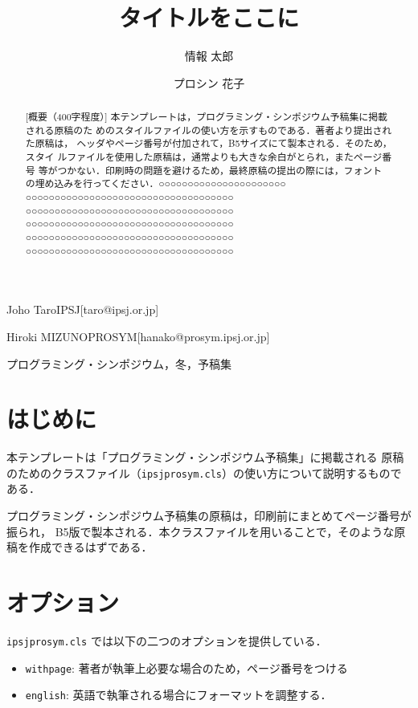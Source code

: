 \documentclass{ipsjprosym}
\begin{document}
\title{タイトルをここに}


\author{情報 太郎}{Joho Taro}{IPSJ}[taro@ipsj.or.jp]
\author{プロシン 花子}{Hiroki MIZUNO}{PROSYM}[hanako@prosym.ipsj.or.jp]

\begin{abstract}
[概要（400字程度）]
本テンプレートは，プログラミング・シンポジウム予稿集に掲載される原稿のた
めのスタイルファイルの使い方を示すものである．著者より提出された原稿は，
ヘッダやページ番号が付加されて，B5サイズにて製本される．そのため，スタイ
ルファイルを使用した原稿は，通常よりも大きな余白がとられ，またページ番号
等がつかない．印刷時の問題を避けるため，最終原稿の提出の際には，フォント
の埋め込みを行ってください．○○○○○○○○○○○○○○○○○○○○○○
○○○○○○○○○○○○○○○○○○○○○○○○○○○○○○○○○○○○
○○○○○○○○○○○○○○○○○○○○○○○○○○○○○○○○○○○○
○○○○○○○○○○○○○○○○○○○○○○○○○○○○○○○○○○○○
○○○○○○○○○○○○○○○○○○○○○○○○○○○○○○○○○○○○
○○○○○○○○○○○○○○○○○○○○○○○○○○○○○○○○○○○○
\end{abstract}

\begin{jkeyword}
プログラミング・シンポジウム，冬，予稿集
\end{jkeyword}

\maketitle

\section{はじめに}

本テンプレートは「プログラミング・シンポジウム予稿集」に掲載される
原稿のためのクラスファイル（\verb|ipsjprosym.cls|）の使い方について説明するものである．

プログラミング・シンポジウム予稿集の原稿は，印刷前にまとめてページ番号が振られ，
B5版で製本される．本クラスファイルを用いることで，そのような原稿を作成できるはずである．

\section{オプション}

\verb|ipsjprosym.cls| では以下の二つのオプションを提供している．
\begin{itemize}
 \item \verb|withpage|: 著者が執筆上必要な場合のため，ページ番号をつける
 \item \verb|english|: 英語で執筆される場合にフォーマットを調整する．
\end{itemize}
\end{document}
